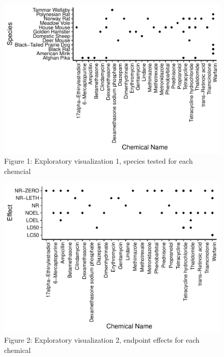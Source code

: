 \documentclass[12pt,]{article}
\begin{document}
\begin{figure}
\centering
\includegraphics{Reents_ENV872L_Project_files/figure-latex/Exploratory 1-1.pdf}
\caption{Figure 1: Exploratory visualization 1, species tested for each
chemcial}
\end{figure}

\begin{figure}
\centering
\includegraphics{Reents_ENV872L_Project_files/figure-latex/Exploratory 2-1.pdf}
\caption{Figure 2: Exploratory visualization 2, endpoint effects for
each chemical}
\end{figure}
\end{document}
